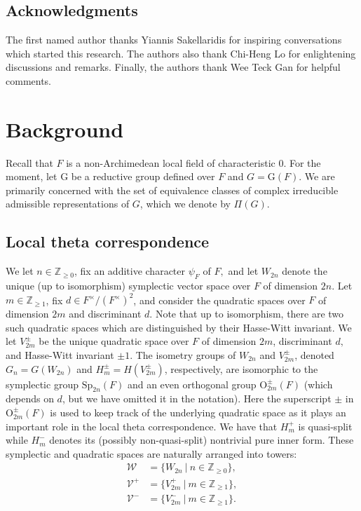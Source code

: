\documentclass[11pt,letterpaper]{amsart}
\newcommand{\OO}{\mathrm{O}}
\newcommand{\Sp}{\mathrm{Sp}}
\numberwithin{equation}{section}
\begin{document}
\subsection*{Acknowledgments}
The first named author thanks Yiannis Sakellaridis for inspiring conversations which started this research. The authors also thank Chi-Heng Lo for enlightening discussions and remarks. Finally, the authors thank Wee Teck Gan for helpful comments.

\section{Background}\label{sec background}

Recall that $F$ is a non-Archimedean local field of characteristic 0. For the moment, let $\mathrm{G}$ be a reductive group defined over $F$ and $G=\mathrm{G}(F).$ We are primarily concerned with the set of equivalence classes of complex irreducible admissible representations of $G$, which we denote by $\Pi(G).$ 

\subsection{Local theta correspondence}\label{sec local theta correspondence}

We let $n\in\mathbb{Z}_{\geq 0}$, fix an additive character $\psi_F$ of $F,$ and 
let $W_{2n}$ denote the unique (up to isomorphism) symplectic vector space over $F$ of dimension $2n.$ 
Let $m\in\mathbb{Z}_{\geq 1}$, fix $d\in F^\times/(F^\times)^2$, and consider the quadratic spaces over $F$ of dimension $2m$ and discriminant $d.$ Note that up to isomorphism, there are two such quadratic spaces which are distinguished by their Hasse-Witt invariant. We let $V_{2m}^\pm$ be the unique quadratic space over $F$ of dimension $2m$, discriminant $d,$ and Hasse-Witt invariant $\pm1.$ The isometry groups of $W_{2n}$ and $V_{2m}^\pm$, denoted $G_n=G(W_{2n})$ and $H_m^\pm=H(V_{2m}^\pm)$, respectively, are isomorphic to the symplectic group $\Sp_{2n}(F)$ and an even orthogonal group $\OO_{2m}^\pm(F)$ (which depends on $d$, but we have omitted it in the notation). Here the superscript $\pm$ in $\OO_{2m}^\pm(F)$ is used to keep track of the underlying quadratic space as it plays an important role in the local theta correspondence. We have that $H_m^+$ is quasi-split while $H_m^-$ denotes its (possibly non-quasi-split) nontrivial pure inner form.
These symplectic and quadratic spaces are naturally arranged into towers:
\begin{align*}
    \mathcal{W}&=\{W_{2n} \ | \ n\in\mathbb{Z}_{\geq 0}\}, \\
    \mathcal{V}^+&=\{V_{2m}^+ \ | \ m\in\mathbb{Z}_{\geq 1}\}, \\
    \mathcal{V}^-&=\{V_{2m}^- \ | \ m\in\mathbb{Z}_{\geq 1}\}.
\end{align*}
\end{document}
